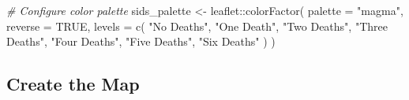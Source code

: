 \documentclass[
]{book}
\newenvironment{Shaded}{\begin{snugshade}}{\end{snugshade}}
\newcommand{\AttributeTok}[1]{\textcolor[rgb]{0.77,0.63,0.00}{#1}}
\newcommand{\CommentTok}[1]{\textcolor[rgb]{0.56,0.35,0.01}{\textit{#1}}}
\newcommand{\ConstantTok}[1]{\textcolor[rgb]{0.00,0.00,0.00}{#1}}
\newcommand{\FunctionTok}[1]{\textcolor[rgb]{0.00,0.00,0.00}{#1}}
\newcommand{\NormalTok}[1]{#1}
\newcommand{\OtherTok}[1]{\textcolor[rgb]{0.56,0.35,0.01}{#1}}
\newcommand{\SpecialCharTok}[1]{\textcolor[rgb]{0.00,0.00,0.00}{#1}}
\newcommand{\StringTok}[1]{\textcolor[rgb]{0.31,0.60,0.02}{#1}}
\begin{document}
\begin{Shaded}
\begin{Highlighting}[]
\CommentTok{\# Configure color palette}
\NormalTok{sids\_palette }\OtherTok{\textless{}{-}} 
\NormalTok{    leaflet}\SpecialCharTok{::}\FunctionTok{colorFactor}\NormalTok{(}
        \AttributeTok{palette =} \StringTok{"magma"}\NormalTok{,}
        \AttributeTok{reverse =} \ConstantTok{TRUE}\NormalTok{,}
        \AttributeTok{levels =} \FunctionTok{c}\NormalTok{(}
                \StringTok{"No Deaths"}\NormalTok{, }
                \StringTok{"One Death"}\NormalTok{, }
                \StringTok{"Two Deaths"}\NormalTok{, }
                \StringTok{"Three Deaths"}\NormalTok{, }
                \StringTok{"Four Deaths"}\NormalTok{, }
                \StringTok{"Five Deaths"}\NormalTok{, }
                \StringTok{"Six Deaths"}
\NormalTok{            )}
\NormalTok{    )}
\end{Highlighting}
\end{Shaded}

\hypertarget{create-the-map}{%
\subsection{Create the Map}\label{create-the-map}}
\end{document}
